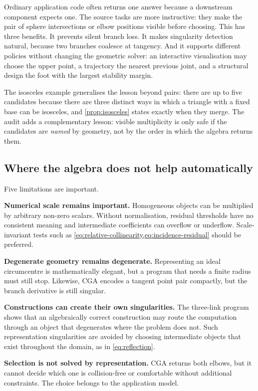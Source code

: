 \documentclass[11pt,a4paper]{article}
\theoremstyle{plain}
\theoremstyle{definition}
\theoremstyle{remark}
\begin{document}
Ordinary application code often returns one answer because a downstream
component expects one. The source tasks are more instructive: they make the
pair of sphere intersections or elbow positions visible before choosing. This
has three benefits. It prevents silent branch loss. It makes singularity
detection natural, because two branches coalesce at tangency. And it supports
different policies without changing the geometric solver: an interactive
visualisation may choose the upper point, a trajectory the nearest previous
joint, and a structural design the foot with the largest stability margin.

The isosceles example generalises the lesson beyond pairs: there are up to five
candidates because there are three distinct ways in which a triangle with a
fixed base can be isosceles, and \cref{prop:isosceles} states exactly when they
merge. The audit adds a complementary lesson: visible multiplicity is only safe
if the candidates are \emph{named} by geometry, not by the order in which the
algebra returns them.

\subsection{Where the algebra does not help automatically}

Five limitations are important.

\textbf{Numerical scale remains important.} Homogeneous objects can be multiplied
by arbitrary non-zero scalars. Without normalisation, residual thresholds have
no consistent meaning and intermediate coefficients can overflow or underflow.
Scale-invariant tests such as \cref{eq:relative-collinearity,eq:incidence-residual}
should be preferred.

\textbf{Degenerate geometry remains degenerate.} Representing an ideal
circumcentre is mathematically elegant, but a program that needs a finite radius
must still stop. Likewise, CGA encodes a tangent point pair compactly, but the
branch derivative is still singular.

\textbf{Constructions can create their own singularities.} The three-link program
shows that an algebraically correct construction may route the computation
through an object that degenerates where the problem does not. Such
representation singularities are avoided by choosing intermediate objects that
exist throughout the domain, as in \cref{eq:reflection}.

\textbf{Selection is not solved by representation.} CGA returns both elbows, but
it cannot decide which one is collision-free or comfortable without additional
constraints. The choice belongs to the application model.
\end{document}
